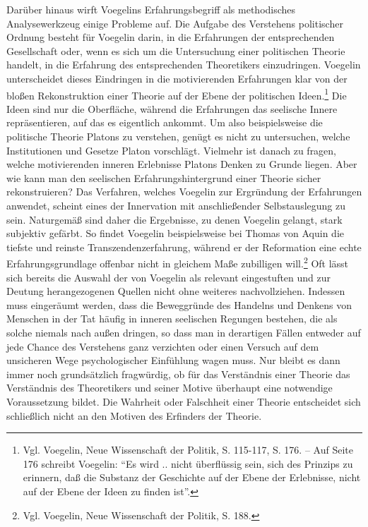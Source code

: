 Darüber hinaus wirft Voegelins Erfahrungsbegriff als methodisches
Analysewerkzeug einige Probleme auf. Die Aufgabe des Verstehens politischer
Ordnung besteht für Voegelin darin, in die Erfahrungen der entsprechenden
Gesellschaft oder, wenn es sich um die Untersuchung einer politischen Theorie
handelt, in die Erfahrung des entsprechenden Theoretikers einzudringen.
Voegelin unterscheidet dieses Eindringen in die motivierenden Erfahrungen klar
von der bloßen Rekonstruktion einer Theorie auf der Ebene der politischen
Ideen.\footnote{Vgl.  Voegelin, Neue Wissenschaft der Politik, S. 115-117,
  S. 176. -- Auf Seite 176 schreibt Voegelin: "`Es wird .. nicht überflüssig
  sein, sich des Prinzips zu erinnern, daß die Substanz der Geschichte auf der
  Ebene der Erlebnisse, nicht auf der Ebene der Ideen zu finden ist"'.} Die
Ideen sind nur die Oberfläche, während die Erfahrungen das seelische Innere
repräsentieren, auf das es eigentlich ankommt. Um also beispielsweise die
politische Theorie Platons zu verstehen, genügt es nicht zu untersuchen,
welche Institutionen und Gesetze Platon vorschlägt. Vielmehr ist danach zu
fragen, welche motivierenden inneren Erlebnisse Platons Denken zu Grunde
liegen. Aber wie kann man den seelischen Erfahrungshintergrund einer Theorie
sicher rekonstruieren? Das Verfahren, welches Voegelin zur Ergründung der
Erfahrungen anwendet, scheint eines der Innervation mit anschließender
Selbstauslegung zu sein. Naturgemäß sind daher die Ergebnisse, zu denen
Voegelin gelangt, stark subjektiv gefärbt. So findet Voegelin beispielsweise
bei Thomas von Aquin die tiefste und reinste Transzendenzerfahrung, während er
der Reformation eine echte Erfahrungsgrundlage offenbar nicht in gleichem Maße
zubilligen will.\footnote{Vgl. Voegelin, Neue Wissenschaft der Politik,
  S. 188.} Oft lässt sich bereits die Auswahl der von Voegelin als relevant
eingestuften und zur Deutung herangezogenen Quellen nicht ohne weiteres
nachvollziehen. Indessen muss eingeräumt werden, dass die Beweggründe des
Handelns und Denkens von Menschen in der Tat häufig in inneren seelischen
Regungen bestehen, die als solche niemals nach außen dringen, so dass man in
derartigen Fällen entweder auf jede Chance des Verstehens ganz verzichten oder
einen Versuch auf dem unsicheren Wege psychologischer Einfühlung wagen muss.
Nur bleibt es dann immer noch grundsätzlich fragwürdig, ob für das Verständnis
einer Theorie das Verständnis des Theoretikers und seiner Motive überhaupt
eine notwendige Voraussetzung bildet. Die Wahrheit oder Falschheit einer
Theorie entscheidet sich schließlich nicht an den Motiven des Erfinders der
Theorie.


